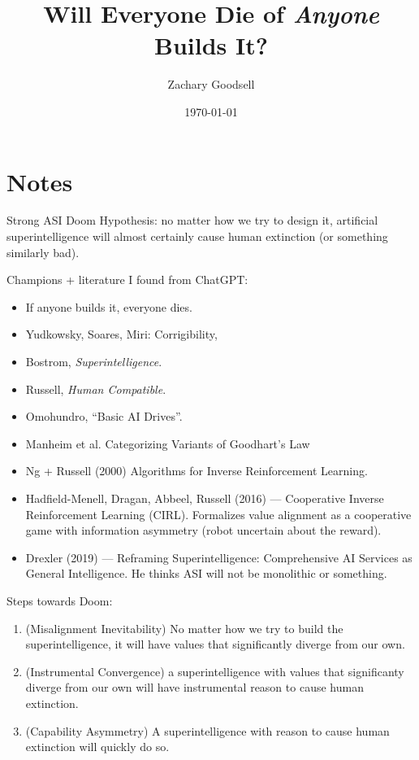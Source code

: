 \documentclass[11pt]{article}
\title{Will Everyone Die of \emph{Anyone} Builds It?}
\author{Zachary Goodsell}
\date{\today}
\begin{document}
\maketitle

\section{Notes}

Strong ASI Doom Hypothesis: no matter how we try to design it, artificial superintelligence will almost certainly cause human extinction (or something similarly bad).

Champions + literature I found from ChatGPT:
\begin{itemize}
    \item If anyone builds it, everyone dies.
    \item Yudkowsky, Soares, Miri: Corrigibility,
    \item Bostrom, \emph{Superintelligence}.
    \item Russell, \emph{Human Compatible}.
    \item Omohundro, ``Basic AI Drives''.
    \item Manheim et al. Categorizing Variants of Goodhart’s Law
    \item Ng + Russell (2000) Algorithms for Inverse Reinforcement Learning.
    \item Hadfield-Menell, Dragan, Abbeel, Russell (2016) — Cooperative Inverse Reinforcement Learning (CIRL). Formalizes value alignment as a cooperative game with information asymmetry (robot uncertain about the reward).
    \item Drexler (2019) — Reframing Superintelligence: Comprehensive AI Services as General Intelligence. He thinks ASI will not be monolithic or something.
\end{itemize}

Steps towards Doom: 
\begin{enumerate}
    \item (Misalignment Inevitability) No matter how we try to build the superintelligence, it will have values that significantly diverge from our own.
    \item (Instrumental Convergence) a superintelligence with values that significanty diverge from our own will have instrumental reason to cause human extinction.
    \item (Capability Asymmetry) A superintelligence with reason to cause human extinction will quickly do so. 
\end{enumerate}
\end{document}
